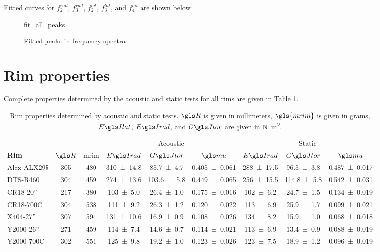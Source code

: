 \documentclass[../../thesis.tex]{subfiles}
\begin{document}
Fitted curves for $f_2^{rad}$, $f_3^{rad}$, $f_2^{lat}$, $f_3^{lat}$, and $f_4^{lat}$ are shown below:

\begin{figure}
\centering
{fit_all_peaks}
\caption{Fitted peaks in frequency spectra}
\label{fig:ema_all_peaks}
\end{figure}


\section{Rim properties}
\label{app:acoustic_properties}

Complete properties determined by the acoustic and static tests for all rims are given in Table \ref{tab:acoustic_properties}.

\begin{table}
\small
\caption{Rim properties determined by acoustic and static tests. $\R$ is given in millimeters, $\gls{mrim}$ is given in grams, $\EIl$, $\EIr$, and $\GJ$ are given in \si{N.m^2}.}
\label{tab:acoustic_properties}
\begin{tabular}{lcccccccc}
\toprule
&&&\multicolumn{3}{c}{Acoustic} & \multicolumn{3}{c}{Static}\\
\cmidrule(r){4-6}
\cmidrule(r){7-9}
\bf{Rim}     & $\R$ & \gls{mrim} & $\EIr$ & $\GJ$ & $\m$ & $\EIr$ & $\GJ$ & $\m$\\
\midrule
Alex-ALX295 & 305 & 480 & \num{310 +- 14.8} & \num{ 85.7 +- 4.7} & \num{0.405 +- 0.061} &
                          \num{288 +- 17.5} & \num{ 96.5 +- 3.8} & \num{0.487 +- 0.017}\\
DTS-R460    & 304 & 459 & \num{274 +- 13.6} & \num{103.6 +- 5.8} & \num{0.449 +- 0.065} &
                          \num{256 +- 15.5} & \num{114.8 +- 5.8} & \num{0.542 +- 0.031}\\
CR18-20''   & 217 & 380 & \num{103 +-  5.0} & \num{ 26.4 +- 1.0} & \num{0.175 +- 0.016} &
                          \num{102 +-  6.2} & \num{ 24.7 +- 1.5} & \num{0.134 +- 0.019}\\
CR18-700C   & 304 & 538 & \num{111 +-  9.2} & \num{ 26.3 +- 1.2} & \num{0.120 +- 0.022} &
                          \num{113 +-  6.9} & \num{ 25.9 +- 1.7} & \num{0.099 +- 0.021}\\
X404-27''   & 307 & 594 & \num{131 +- 10.6} & \num{ 16.9 +- 0.9} & \num{0.108 +- 0.026} &
                          \num{134 +-  8.2} & \num{ 15.9 +- 1.0} & \num{0.068 +- 0.018}\\
Y2000-26''  & 271 & 459 & \num{114 +-  7.4} & \num{ 14.6 +- 0.7} & \num{0.114 +- 0.021} &
                          \num{113 +-  6.9} & \num{ 13.4 +- 0.9} & \num{0.088 +- 0.019}\\
Y2000-700C  & 302 & 551 & \num{125 +-  9.8} & \num{ 19.2 +- 1.0} & \num{0.123 +- 0.026} &
                          \num{123 +-  7.5} & \num{ 18.9 +- 1.2} & \num{0.096 +- 0.019}\\
\bottomrule
\end{tabular}
\end{table}
\end{document}
